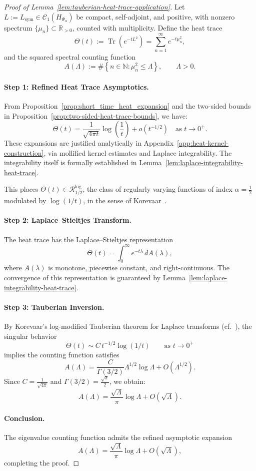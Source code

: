 \begin{proof}[Proof of Lemma~\ref{lem:tauberian-heat-trace-application}]
Let \( L := L_{\mathrm{sym}} \in \mathcal{C}_1(H_{\Psi_\alpha}) \) be compact, self-adjoint, and positive, with nonzero spectrum \( \{ \mu_n \} \subset \mathbb{R}_{>0} \), counted with multiplicity. Define the heat trace
\[
\Theta(t) := \operatorname{Tr}(e^{-t L^2}) = \sum_{n=1}^\infty e^{-t \mu_n^2},
\]
and the squared spectral counting function
\[
A(\Lambda) := \#\left\{ n \in \mathbb{N} : \mu_n^2 \le \Lambda \right\}, \qquad \Lambda > 0.
\]

\paragraph{Step 1: Refined Heat Trace Asymptotics.}
From Proposition~\ref{prop:short_time_heat_expansion} and the two-sided bounds in Proposition~\ref{prop:two-sided-heat-trace-bounds}, we have:
\[
\Theta(t) = \frac{1}{\sqrt{4\pi t}} \log\left( \frac{1}{t} \right) + o(t^{-1/2}) \quad \text{as } t \to 0^+.
\]
These expansions are justified analytically in Appendix~\ref{app:heat-kernel-construction}, via mollified kernel estimates and Laplace integrability. The integrability itself is formally established in Lemma~\ref{lem:laplace-integrability-heat-trace}.

This places \( \Theta(t) \in \mathcal{R}_{1/2}^{\log} \), the class of regularly varying functions of index \( \alpha = \tfrac{1}{2} \) modulated by \( \log(1/t) \), in the sense of Korevaar~\cite[Ch.~III, §5]{Korevaar2004Tauberian}.

\paragraph{Step 2: Laplace–Stieltjes Transform.}
The heat trace has the Laplace–Stieltjes representation
\[
\Theta(t) = \int_0^\infty e^{-t \lambda} \, dA(\lambda),
\]
where \( A(\lambda) \) is monotone, piecewise constant, and right-continuous. The convergence of this representation is guaranteed by Lemma~\ref{lem:laplace-integrability-heat-trace}.

\paragraph{Step 3: Tauberian Inversion.}
By Korevaar’s log-modified Tauberian theorem for Laplace transforms (cf.~\cite[Thm.~5.5]{Korevaar2004Tauberian}), the singular behavior
\[
\Theta(t) \sim C \, t^{-1/2} \log(1/t) \qquad \text{as } t \to 0^+
\]
implies the counting function satisfies
\[
A(\Lambda) = \frac{C}{\Gamma(3/2)} \Lambda^{1/2} \log \Lambda + O(\Lambda^{1/2}).
\]
Since \( C = \frac{1}{\sqrt{4\pi}} \) and \( \Gamma(3/2) = \frac{\sqrt{\pi}}{2} \), we obtain:
\[
A(\Lambda) = \frac{\sqrt{\Lambda}}{\pi} \log \Lambda + O(\sqrt{\Lambda}).
\]

\paragraph{Conclusion.}
The eigenvalue counting function admits the refined asymptotic expansion
\[
A(\Lambda) = \frac{\sqrt{\Lambda}}{\pi} \log \Lambda + O(\sqrt{\Lambda}),
\]
completing the proof.
\end{proof}
